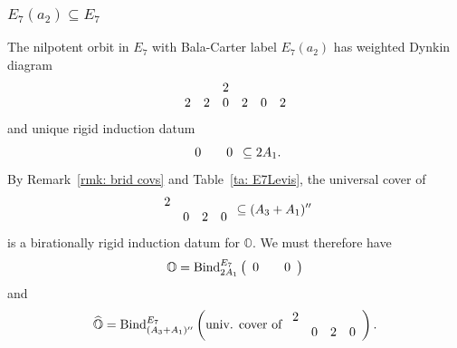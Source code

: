 \documentclass[11pt]{amsart}
\renewcommand{\O}{{\mathbb O}}
\newcommand{\bZ}{{\mathbb Z}}
\newcommand{\BInd}{{{\mbox{\rm Bind}}}}
\newcommand{\hatO}{\widehat{\O}}
\numberwithin{equation}{section}
\begin{document}

	
	\subsubsection{\texorpdfstring{$E_7(a_2)\subseteq E_7$}{E7a2 in E7}}\label{sss: E7a2 in E7}
	
	The nilpotent orbit in $E_7$ with Bala-Carter label $E_7(a_2)$ has weighted Dynkin diagram $$\begin{array}{c c c c c c}
		& & 2 & & & \\
		2 & 2 & 0 & 2 & 0 & 2 \\
	\end{array}$$ and unique rigid induction datum
	$$\begin{array}{c c c}
		0 & & 0 \\
	\end{array}\subseteq 2 A_1.$$
	By Remark~\ref{rmk: brid covs} and Table~\ref{ta: E7Levis}, the universal cover of $$\begin{array}{c c c c c c}
		2 & & & \\
		 & 0 & 2 & 0 \\
	\end{array}\subseteq (A_3+A_1)''$$ is a birationally rigid induction datum for $\O$. We must therefore have
	$$\O = \BInd_{2A_1}^{E_7}\left(\begin{array}{c c c}
		0 & & 0 \\
	\end{array} \right)$$
	and
	$$\hatO = \BInd_{(A_3+A_1)''}^{E_7}\left( \mbox{univ. cover of }\begin{array}{c c c c c c}
		 2 & & & \\
		 & 0 & 2 & 0 \\
	\end{array} \right).$$
	
\end{document}

